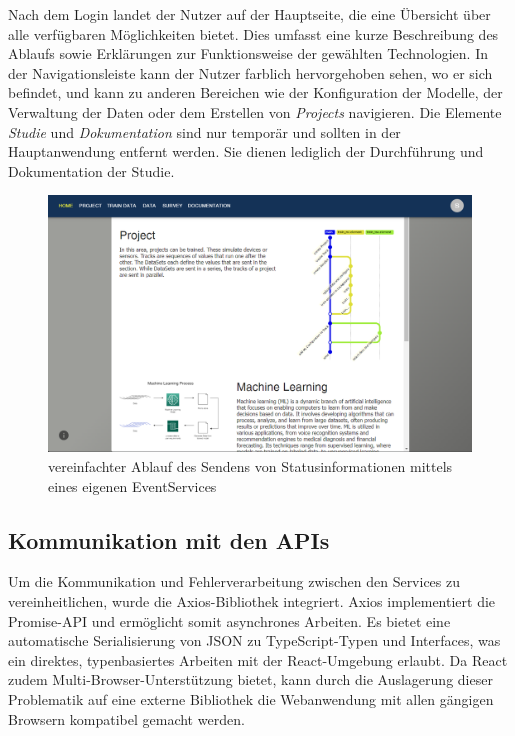 Nach dem Login landet der Nutzer auf der Hauptseite, die eine Übersicht über alle verfügbaren Möglichkeiten bietet. Dies umfasst eine kurze Beschreibung des Ablaufs sowie Erklärungen zur Funktionsweise der gewählten Technologien. 
In der Navigationsleiste kann der Nutzer farblich hervorgehoben sehen, wo er sich befindet, und kann zu anderen Bereichen wie der Konfiguration der Modelle, der Verwaltung der Daten oder dem Erstellen von \textit{Projects} navigieren. 
Die Elemente \textit{Studie} und \textit{Dokumentation} sind nur temporär und sollten in der Hauptanwendung entfernt werden. Sie dienen lediglich der Durchführung und Dokumentation der Studie.
\begin{figure}[h]
    \centering
    \includegraphics[width=1\linewidth]{includes/figures/new_version/main_page.png}
    \caption{vereinfachter Ablauf des Sendens von Statusinformationen mittels eines eigenen EventServices}
\label{fig:main_page}
\end{figure}





\subsection{Kommunikation mit den APIs}
\label{sec:frontendCommunication}
Um die Kommunikation und Fehlerverarbeitung zwischen den Services zu vereinheitlichen, wurde die Axios-Bibliothek integriert. 
Axios implementiert die Promise-API und ermöglicht somit asynchrones Arbeiten. Es bietet eine automatische Serialisierung von JSON zu TypeScript-Typen und Interfaces, was ein direktes, 
typenbasiertes Arbeiten mit der React-Umgebung erlaubt. Da React zudem Multi-Browser-Unterstützung bietet, kann durch die Auslagerung dieser Problematik auf eine externe Bibliothek die Webanwendung mit allen gängigen Browsern kompatibel gemacht werden.



